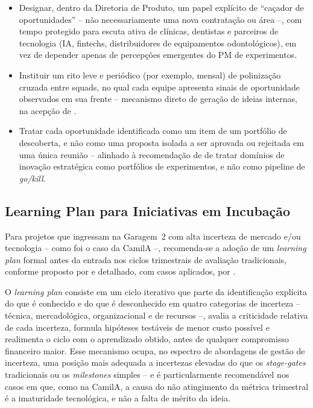 \begin{itemize}
  \item Designar, dentro da Diretoria de Produto, um papel explícito de ``caçador de oportunidades'' -- não necessariamente uma nova contratação ou área --, com tempo protegido para escuta ativa de clínicas, dentistas e parceiros de tecnologia (IA, fintechs, distribuidores de equipamentos odontológicos), em vez de depender apenas de percepções emergentes do PM de experimentos.
  \item Instituir um rito leve e periódico (por exemplo, mensal) de polinização cruzada entre squads, no qual cada equipe apresenta sinais de oportunidade observados em sua frente -- mecanismo direto de geração de ideias internas, na acepção de \textcite{hansenbirkinshaw2007}.
  \item Tratar cada oportunidade identificada como um item de um portfólio de descoberta, e não como uma proposta isolada a ser aprovada ou rejeitada em uma única reunião -- alinhado à recomendação de \textcite{oconnormeyer2026} de tratar domínios de inovação estratégica como portfólios de experimentos, e não como pipeline de \textit{go/kill}.
\end{itemize}

\subsection{Learning Plan para Iniciativas em Incubação}

Para projetos que ingressam na Garagem~2 com alta incerteza de mercado e/ou tecnologia -- como foi o caso da CamilA --, recomenda-se a adoção de um \textit{learning plan} formal antes da entrada nos ciclos trimestrais de avaliação tradicionais, conforme proposto por \textcite{riceoconnorpierantozzi2008} e detalhado, com casos aplicados, por \textcite{salernogomes2018}.

O \textit{learning plan} consiste em um ciclo iterativo que parte da identificação explícita do que é conhecido e do que é desconhecido em quatro categorias de incerteza -- técnica, mercadológica, organizacional e de recursos --, avalia a criticidade relativa de cada incerteza, formula hipóteses testáveis de menor custo possível e realimenta o ciclo com o aprendizado obtido, antes de qualquer compromisso financeiro maior. Esse mecanismo ocupa, no espectro de abordagens de gestão de incerteza, uma posição mais adequada a incertezas elevadas do que os \textit{stage-gates} tradicionais ou os \textit{milestones} simples -- e é particularmente recomendável nos casos em que, como na CamilA, a causa do não atingimento da métrica trimestral é a imaturidade tecnológica, e não a falta de mérito da ideia.


